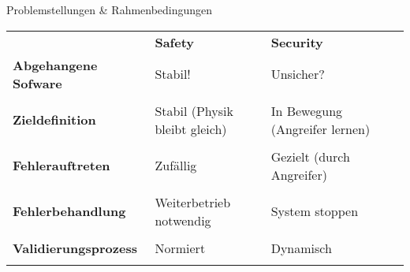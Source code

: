 \begin{frame}[T]{Problemstellungen \& Rahmenbedingungen}
\small

	\begin{tabular}{lllll}
                               & \textbf{Safety}              & \textbf{Security}              \\[1.4em]

  \arrayrulecolor{lightgray}
  \textbf{Abgehangene Sofware} & Stabil!                      & Unsicher?                      \\[0.35em]
  \midrule                                                                                     \\[-0.75em]
  \textbf{Zieldefinition}      & Stabil (Physik bleibt gleich) & In Bewegung (Angreifer lernen)  \\[0.35em]
  \midrule                                                                                     \\[-0.75em]
  \textbf{Fehlerauftreten}     & Zufällig                     & Gezielt (durch Angreifer)      \\[0.35em]
  \midrule                                                                                     \\[-0.75em]
  \textbf{Fehlerbehandlung}    & Weiterbetrieb notwendig      & System stoppen                 \\[0.35em]
  \midrule                                                                                     \\[-0.75em]
  \textbf{Validierungsprozess} & Normiert                     & Dynamisch                      \\
	                             &                              &
	\end{tabular}


\end{frame}
